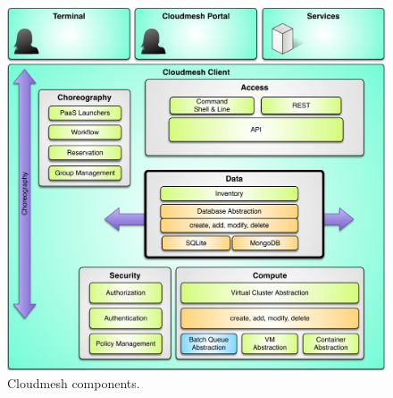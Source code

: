 \begin{figure}[hp]
  \centering
      \includegraphics[width=1.0\columnwidth]{images/cloudmesh-arch-2.pdf}
  \caption{Cloudmesh components.} 
  \label{F:NIST-arch}
\end{figure}

